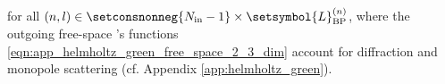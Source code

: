 for
all $( n, l ) \in \setconsnonneg{ N_{\text{in}} - 1 } \times \setsymbol{L}_{ \text{BP} }^{(n)}$, where
the outgoing free-space 's functions
\eqref{eqn:app_helmholtz_green_free_space_2_3_dim} account for
diffraction and
monopole scattering
(cf. Appendix \ref{app:helmholtz_green}).
